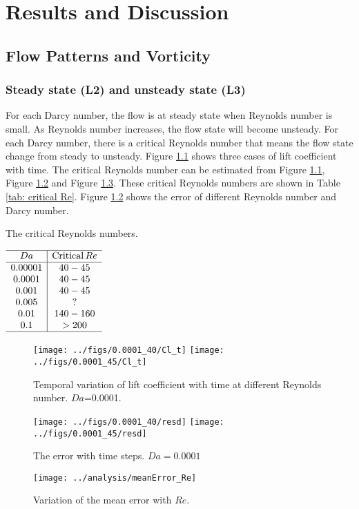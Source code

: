 \chapter{Results and Discussion}
\section{Flow Patterns and Vorticity}
\subsection{Steady state (L2) and unsteady state (L3)}
For each Darcy number, the flow is at steady state when Reynolds number is small. As Reynolds number increases, the flow state will become unsteady.
For each Darcy number, there is a critical Reynolds number that means the flow state change from steady to unsteady. Figure \ref{fig: Cl_t} shows three cases of lift coefficient with time. The critical Reynolds number can be estimated from Figure \ref{fig: Cl_t}, Figure \ref{fig: resd} and Figure \ref{fig: error}.  These critical Reynolds numbers are shown in Table \ref{tab: critical Re}.
Figure \ref{fig: resd} shows the error of different Reynolds number and Darcy number.
\begin{table}[]
	\centering
	\caption{The critical Reynolds numbers.}\label{tab: critical Re}
	$\begin{array}{c|c}
	\hline
	Da & \mathrm{Critical}\, Re \\ \hline
	0.00001& 40-45   \\
	0.0001 & 40-45 \\
	0.001  & 40-45 \\
	0.005  & ?   \\
	0.01   & 140-160 \\
	0.1    & >200\\
	\hline
	\end{array}$
\end{table}
\begin{figure}
	\centering
	{\texttt{[image: ../figs/0.0001\_40/Cl\_t]}}
	{\texttt{[image: ../figs/0.0001\_45/Cl\_t]}}
	\caption{Temporal variation of lift coefficient with time at different Reynolds number. $Da$=0.0001.}
	\label{fig: Cl_t}
\end{figure}
\begin{figure}
	\centering
	{\texttt{[image: ../figs/0.0001\_40/resd]}}
	{\texttt{[image: ../figs/0.0001\_45/resd]}}
	\caption{The error with time steps. $Da=0.0001$}
	\label{fig: resd}
\end{figure}
\begin{figure}
	\centering
	\texttt{[image: ../analysis/meanError\_Re]}
	\caption{Variation of the mean error with $Re$.}
	\label{fig: error}
\end{figure}

